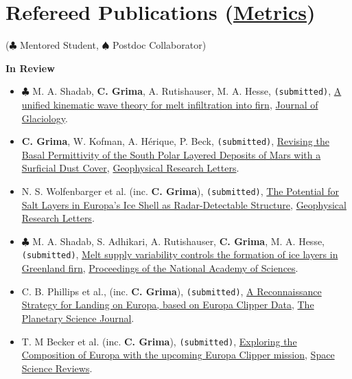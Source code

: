 \section*{Refereed Publications (\href{https://scholar.google.com/citations?user=kaUVku0AAAAJ&hl=fr}{Metrics})}

($\clubsuit$ Mentored Student, $\spadesuit$ Postdoc Collaborator)
\vspace{1em}

\textbf{In Review}
\begin{itemize}

\item
  $\clubsuit$ M. A. Shadab, \textbf{C. Grima}, A. Rutishauser, M. A. Hesse, \texttt{(submitted)}, \href{}{A unified kinematic wave theory for melt infiltration into firn}, \ul{Journal of Glaciology}. 

\item
  \textbf{C. Grima}, W. Kofman, A. Hérique, P. Beck, \texttt{(submitted)}, \href{}{Revising the Basal Permittivity of the South Polar Layered Deposits of Mars with a Surficial Dust Cover}, \ul{Geophysical Research Letters}.

\item
  N. S. Wolfenbarger et al. (inc. \textbf{C. Grima}), \texttt{(submitted)}, \href{}{The Potential for Salt Layers in Europa’s Ice Shell as Radar-Detectable Structure}, \ul{Geophysical Research Letters}.

\item
  $\clubsuit$ M. A. Shadab, S. Adhikari, A. Rutishauser, \textbf{C. Grima}, M. A. Hesse, \texttt{(submitted)}, \href{}{Melt supply variability controls the formation of ice layers in Greenland firn}, \ul{Proceedings of the National Academy of Sciences}. 

\item
  C. B. Phillips et al., (inc. \textbf{C. Grima}), \texttt{(submitted)}, \href{}{A Reconnaissance Strategy for Landing on Europa, based on Europa Clipper Data}, \ul{The Planetary Science Journal}. 

\item
  T. M Becker et al. (inc. \textbf{C. Grima}), \texttt{(submitted)}, \href{}{Exploring the Composition of Europa with the upcoming Europa Clipper mission}, \ul{Space Science Reviews}.

\end{itemize}

  

